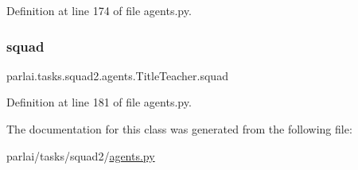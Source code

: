 Definition at line 174 of file agents.\+py.

\mbox{\label{classparlai_1_1tasks_1_1squad2_1_1agents_1_1TitleTeacher_a192c7e24f0159dcb8c512526e7f8a1fb}} 
\subsubsection{\texorpdfstring{squad}{squad}}
{\footnotesize\ttfamily parlai.\+tasks.\+squad2.\+agents.\+Title\+Teacher.\+squad}



Definition at line 181 of file agents.\+py.



The documentation for this class was generated from the following file\+:\begin{DoxyCompactItemize}
\item 
parlai/tasks/squad2/\hyperlink{parlai_2tasks_2squad2_2agents_8py}{agents.\+py}\end{DoxyCompactItemize}

